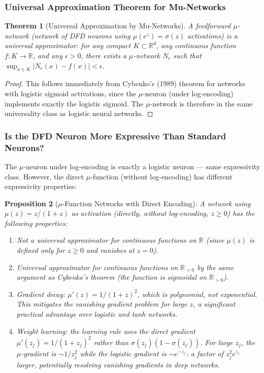 \documentclass[11pt]{article}
\newtheorem{theorem}{Theorem}[section]
\newtheorem{proposition}[theorem]{Proposition}
\theoremstyle{definition}
\theoremstyle{remark}
\newcommand{\mufn}{\mu}
\begin{document}
\subsubsection{Universal Approximation Theorem for Mu-Networks}

\begin{theorem}[Universal Approximation by Mu-Networks]
\label{thm:universal_approx}
A feedforward $\mu$-network (network of DFD neurons using $\mufn(e^z) = \sigma(z)$
activations) is a universal approximator: for any compact $K \subset \mathbb{R}^d$,
any continuous function $f: K \to \mathbb{R}$, and any $\epsilon > 0$,
there exists a $\mu$-network $N_\epsilon$ such that
$\sup_{x \in K}|N_\epsilon(x) - f(x)| < \epsilon$.
\end{theorem}

\begin{proof}
This follows immediately from Cybenko's (1989) theorem for networks with
logistic sigmoid activations, since the $\mu$-neuron (under log-encoding)
implements exactly the logistic sigmoid. The $\mu$-network is therefore
in the same universality class as logistic neural networks.
\end{proof}

\subsubsection{Is the DFD Neuron More Expressive Than Standard Neurons?}

The $\mu$-neuron under log-encoding is exactly a logistic neuron ---
same expressivity class. However, the direct $\mu$-function (without
log-encoding) has different expressivity properties:

\begin{proposition}[$\mu$-Function Networks with Direct Encoding]
\label{prop:direct_mu}
A network using $\mufn(z) = z/(1+z)$ as activation (directly, without
log-encoding, $z \geq 0$) has the following properties:
\begin{enumerate}[label=(\roman*)]
\item Not a universal approximator for continuous functions on $\mathbb{R}$
  (since $\mufn(z)$ is defined only for $z \geq 0$ and vanishes at $z=0$).
\item Universal approximator for continuous functions on $\mathbb{R}_{>0}$
  by the same argument as Cybenko's theorem (the function is sigmoidal
  on $\mathbb{R}_{>0}$).
\item Gradient decay: $\mufn'(z) = 1/(1+z)^2$, which is polynomial,
  not exponential. This mitigates the vanishing gradient problem for
  large $z$, a significant practical advantage over logistic and tanh
  networks.
\item Weight learning: the learning rule uses the direct gradient
  $\mufn'(z_j) = 1/(1+z_j)^2$ rather than $\sigma(z_j)(1-\sigma(z_j))$.
  For large $z_j$, the $\mu$-gradient is $\sim 1/z_j^2$ while the
  logistic gradient is $\sim e^{-z_j}$: a factor of $z_j^2 e^{z_j}$
  larger, potentially resolving vanishing gradients in deep networks.
\end{enumerate}
\end{proposition}
\end{document}
